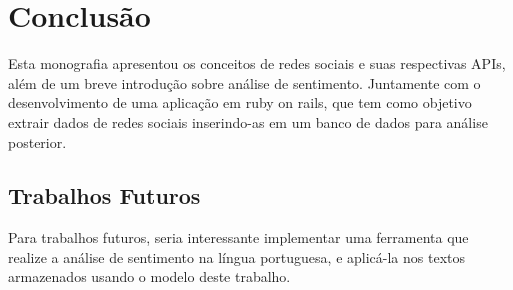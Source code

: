 \chapter{Conclusão}
\label{conclusao}

Esta monografia apresentou os conceitos de redes sociais e suas respectivas APIs, além de um breve introdução sobre análise de sentimento. Juntamente com o desenvolvimento de uma aplicação em ruby on rails, que tem como objetivo extrair dados de redes sociais inserindo-as em um banco de dados para análise posterior.
  
  
  
  
  

   
\section{Trabalhos Futuros}
 Para trabalhos futuros, seria interessante implementar uma ferramenta que realize a análise de sentimento na língua portuguesa, e aplicá-la nos textos armazenados usando o modelo deste trabalho.